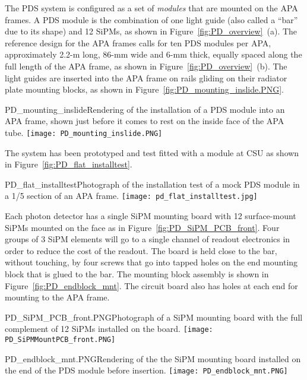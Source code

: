 The PDS system is configured as a set of \textit{modules} that are mounted on the APA frames.  A PDS module is
the combination of one light guide (also called a ``bar'' due to its
shape) and 12 SiPMs, as shown in Figure~\ref{fig:PD_overview}~(a). 
The reference design for the APA frames calls for ten PDS modules per APA, approximately 2.2-m long,
86-mm wide and 6-mm thick, equally spaced along the full length of the
APA frame, as shown in Figure~\ref{fig:PD_overview}~(b). 
The light guides are inserted into the APA frame on rails gliding on their radiator
plate mounting blocks, as shown in Figure~\ref{fig:PD_mounting_inslide.PNG}.

\begin{cdrfigure}
  {PD_mounting_inslide}{Rendering of the installation of a PDS module
    into an APA frame, shown just before it comes to rest on the inside face
    of the APA tube.}
\texttt{[image: PD\_mounting\_inslide.PNG]}
\end{cdrfigure}

The system has been prototyped and test fitted with a module at CSU 
as shown in Figure~\ref{fig:PD_flat_installtest}.
\begin{cdrfigure}
  {PD_flat_installtest}{Photograph of the installation
    test of a mock PDS module in a 1/5 section of an APA frame.}
\texttt{[image: pd\_flat\_installtest.jpg]}
\end{cdrfigure}


Each photon detector has a single SiPM mounting board with 12 surface-mount SiPMs 
mounted on the face as in Figure~\ref{fig:PD_SiPM_PCB_front}.
Four groups of $3$ SiPM elements will go to a single 
channel of readout electronics in order to reduce the cost of the readout.
The board is held close to the bar, without touching, by four screws that go into 
tapped holes on the end mounting block that is glued to the bar.  
The mounting block assembly is shown in Figure~\ref{fig:PD_endblock_mnt}.
The circuit board also has holes at each end for mounting to the APA frame.  
\begin{cdrfigure}
  {PD_SiPM_PCB_front.PNG}{Photograph of a SiPM mounting board
    with the full complement of 12 SiPMs installed on the board.}
\texttt{[image: PD\_SiPMMountPCB\_front.PNG]}
\end{cdrfigure}
\begin{cdrfigure}
  {PD_endblock_mnt.PNG}{Rendering of the the SiPM mounting board
    installed on the end of the PDS module before insertion.}
\texttt{[image: PD\_endblock\_mnt.PNG]}
\end{cdrfigure}

